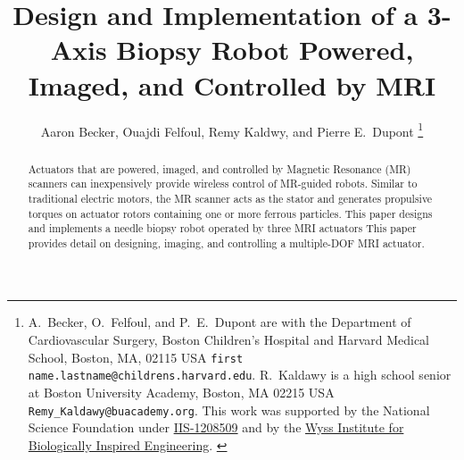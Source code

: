 \documentclass[letterpaper, 10 pt]{IEEEtran}
\begin{document}

\title{\LARGE \bf 
Design and Implementation of a 3-Axis Biopsy Robot Powered, Imaged, and Controlled by MRI
}
\author{Aaron Becker, Ouajdi Felfoul, Remy Kaldwy, and Pierre E.\ Dupont%
\thanks{{A.~Becker, O.~Felfoul, and P.~E.~Dupont are with the Department of Cardiovascular Surgery,  Boston Children's Hospital and Harvard Medical School, Boston, MA, 02115 USA {\tt\small first name.lastname@childrens.harvard.edu}. R.~Kaldawy  is a high school  senior at Boston University Academy, Boston, MA 02215 USA {\tt\small Remy_Kaldawy@buacademy.org}. This work was supported by the National Science Foundation under
\href{http://nsf.gov/awardsearch/showAward?AWD_ID=1208509}{IIS-1208509} and by the \href{http://wyss.harvard.edu/}{Wyss Institute for Biologically Inspired Engineering}.  
}
} %
} %



\maketitle

\begin{abstract}
Actuators that are powered, imaged, and controlled by Magnetic Resonance (MR) scanners can inexpensively provide wireless control of MR-guided robots. Similar to traditional electric motors, the MR scanner acts as the stator and generates propulsive torques on actuator rotors containing one or more ferrous particles. This paper designs and implements a needle biopsy robot operated by three MRI actuators
This paper provides detail on designing, imaging, and controlling a multiple-DOF MRI actuator. 
\end{abstract}

\end{document}

